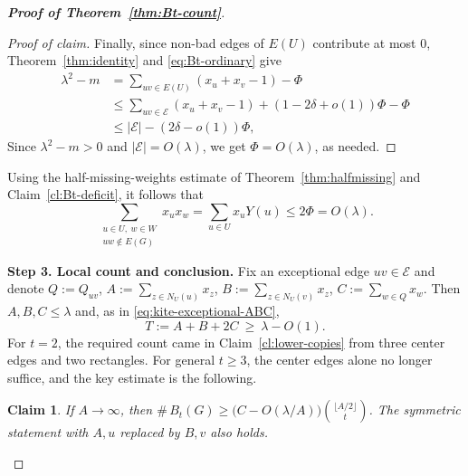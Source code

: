 \documentclass[11pt,a4paper]{article}
\newtheorem{claim}[theorem]{Claim}
\theoremstyle{definition}
\theoremstyle{plain}
\renewcommand{\le}{\leqslant}
\renewcommand{\ge}{\geqslant}
\begin{document}
\begin{proof}[{\bf Proof of Theorem~\ref{thm:Bt-count}}]
\begin{proof}[Proof of claim]
Finally, since non-bad edges of $E(U)$ contribute at most $0$,
Theorem~\ref{thm:identity} and \eqref{eq:Bt-ordinary} give
\begin{align*}
  \lambda^2-m &= \sum_{uv\in E(U)} (x_u+x_v -1) - \Phi \\ 
   &\le\sum_{uv\in\mathcal E}(x_u+x_v-1)+(1-2\delta+o(1))\Phi-\Phi \\
   & \le |\mathcal E|-(2\delta-o(1))\Phi,
\end{align*}
Since $ \lambda^2- m >0$ and $|\mathcal{E}| = O(\lambda)$, we get $\Phi=O(\lambda)$, as needed. 
\end{proof}

Using the half-missing-weights estimate of  Theorem~\ref{thm:halfmissing} and Claim~\ref{cl:Bt-deficit}, it follows that 
\begin{equation}\label{eq:Bt-missing}
   \sum_{\substack{u\in U,\ w\in W\\ uw\notin E(G)}}x_ux_w
   =\sum_{u\in U}x_uY(u)\le 2\Phi=O(\lambda).
\end{equation}

\medskip
\noindent\textbf{Step 3. Local count and conclusion.}
Fix an exceptional edge $uv\in\mathcal E$ and denote 
$Q:=Q_{uv}$, $A:=\sum_{z\in N_U(u)}x_z$, $B:=\sum_{z\in N_U(v)}x_z$,
$C:=\sum_{w\in Q}x_w$.  Then $A,B,C\le\lambda$ and, as in
\eqref{eq:kite-exceptional-ABC},
\begin{equation}\label{eq:Bt-ABC}
   T:=A+B+2C\ \ge\ \lambda-O(1).
\end{equation}
For $t=2$, the required count came in Claim~\ref{cl:lower-copies} from three
center edges and two rectangles.  For general $t\ge 3$, the center edges alone no
longer suffice, and the key estimate is the following.

\begin{claim}  
\label{lem:Bt-rect} 
If $A\to\infty$, then
$\texttt{\#}\,B_t(G)\ge\bigl(C-O(\lambda/A)\bigr)\binom{\lfloor A/2\rfloor}{t}$.
The symmetric statement with $A,u$ replaced by $B,v$ also holds.
\end{claim}


\end{proof}
\end{document}

